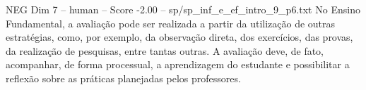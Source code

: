 \begin{textsample}{NEG Dim 7 – human – Score -2.00 – sp/sp\_inf\_e\_ef\_intro\_9\_p6.txt}  \label{ex:f7_neg_008}
No Ensino Fundamental, a avaliação pode ser realizada a partir da utilização de outras estratégias, como, por exemplo, da observação direta, dos exercícios, das provas, da realização de pesquisas, entre tantas outras.
A avaliação deve, de fato, acompanhar, de forma processual, a aprendizagem do estudante e possibilitar a reflexão sobre as práticas planejadas pelos professores.

\end{textsample}
